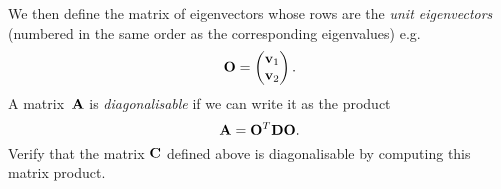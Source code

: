 {\begin{enumerate}
\[            \]
            We then define the matrix of eigenvectors whose rows are the
            \emph{unit eigenvectors} (numbered in the same order as the
            corresponding eigenvalues) e.g.
            \[
                {\bf O} =
                \begin{pmatrix}
                    {\bf v}_1 \\
                    {\bf v}_2
                \end{pmatrix}.
            \]
            A matrix~${\bf A}$ is \emph{diagonalisable} if we can write it as the
            product
            \[
                {\bf A} = {\bf O}^T {\bf D} {\bf O}.
            \]
            Verify that the matrix ${\bf C}$ defined above is diagonalisable
            by computing this matrix product.
    \end{enumerate}
}
